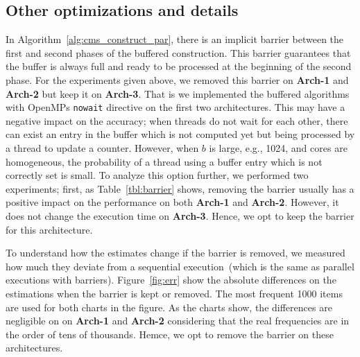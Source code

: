 \documentclass[10pt, review=true,sigconf]{acmart}
\begin{document}
\subsection{Other optimizations and details}

In Algorithm~\ref{alg:cms_construct_par}, there is an implicit barrier between the first and second phases of the buffered construction. This barrier guarantees that the buffer is always full and ready to be processed at the beginning of the second phase. For the experiments given above, we removed this barrier on \textbf{Arch-1} and \textbf{Arch-2} but keep it on \textbf{Arch-3}. That is we implemented the buffered algorithms with OpenMPs {\tt nowait} directive on the first two architectures. This may have a negative impact on the accuracy; when threads do not wait for each other, there can exist an entry in the buffer which is not computed yet but being processed by a thread to update a counter. However, when $b$ is large, e.g., 1024, and cores are homogeneous, the probability of a thread using a buffer entry which is not correctly set is small. To analyze this option further, we performed two experiments; first, as Table~\ref{tbl:barrier} shows, removing the barrier usually has a positive impact on the performance on both \textbf{Arch-1} and \textbf{Arch-2}. However, it does not change the execution time on \textbf{Arch-3}. Hence, we opt to keep the barrier for this architecture.

To understand how the estimates change if the barrier is removed, we measured how much they deviate from a sequential execution~(which is the same as parallel executions with barriers). Figure~\ref{fig:err} show the absolute differences on the estimations when the barrier is kept or removed. The most frequent 1000 items are used for both charts in the figure. As the charts show, the differences are negligible on on \textbf{Arch-1} and \textbf{Arch-2} considering that the real frequencies are in the order of tens of thousands. Hemce, we opt to remove the barrier on these architectures. 
 
\end{document}
